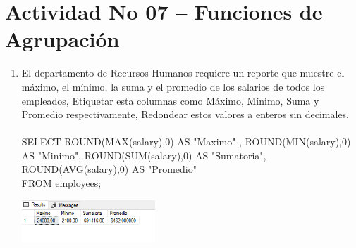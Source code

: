 \section{Actividad No 07 – Funciones de Agrupaci\'on} 
		
\begin{enumerate}[1.]
	\item El departamento de Recursos Humanos requiere un reporte que muestre el máximo, el mínimo, la suma y el promedio de los salarios de todos los empleados, Etiquetar esta columnas como Máximo, Mínimo, Suma y Promedio respectivamente, Redondear estos valores a enteros sin decimales.
	\\
	\\SELECT ROUND(MAX(salary),0) AS "Maximo" , ROUND(MIN(salary),0) AS "Minimo", ROUND(SUM(salary),0) AS "Sumatoria", ROUND(AVG(salary),0) AS "Promedio"
	\\FROM employees;
    	\begin{center}
	\includegraphics[width=5cm]{./Imagenes/a7a1} 
	\end{center}


\end{enumerate}
